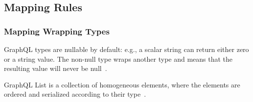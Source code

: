 
\subsection{Mapping Rules}



  




\begin{frame}\frametitle{Mapping Wrapping Types}

\begin{itemize}

   GraphQL types are nullable by default: e.g., a scalar string can return either zero or a string value. The non-null type wraps another type and means that the resulting value will never be null~\cite{gql-spec}.


   GraphQL List is a collection of homogeneous elements, where the elements are ordered and serialized according to their type~\cite{gql-spec}. 
\end{itemize}

\end{frame}

